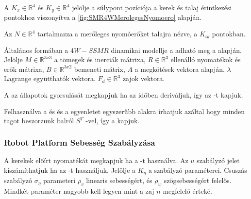 A $K_x\in \mathbb{R}^4$ és $K_y\in \mathbb{R}^4$ jelölje a súlypont pozíciója a kerek és talaj érintkezési pontokhoz viszonyítva a \ref{fig:SMR4WMerolegesNyomoero} alapján.

Az $N \in \mathbb{R}^4$ tartalmazza a merőleges nyomóerőket talajra nézve, a $K_{ik}$ pontokban. 



Általános formában a $4W-SSMR$ dinamikai modellje a  adható meg a \cite{RobustMotionControl} alapján. Jelölje $M \in \mathbb{R}^{3x3}$ a tömegek és inerciák mátrixa, $R \in \mathbb{R}^{3}$ ellenálló nyomatékok és erők mátrixa,  $B \in \mathbb{R}^{3x2}$ bemeneti mátrix, $A$ a megkötések vektora  alapján, $\lambda$ Lagrange együtthatók vektora. $F_d \in \mathbb{R}^{3}$ zajok vektora.

A   az állapotok gyorsulását megkapjuk ha az  időben deriváljuk, így az -t kapjuk.

Felhasználva a   és  és  a  egyenletet egyszerűbb alakra írhatjuk azáltal hogy minden tagot beszorzunk balról $S^T$ -vel, így a  kapjuk.





\subsubsection{Robot Platform Sebesség Szabályzása}

A kerekek előírt nyomatékát megkapjuk ha a   -t használva. Az $u$ szabályzó jelet kiszámíthatjuk ha az -t használjuk. Jelölje a $K_\eta$ a szabályzó paraméterei. Csuszás szabályzó  $\sigma_\eta$ parameteri $\rho_v$ linearis sebességért, és $\rho_w$ szögsebességért felelős. Mindkét paraméter nagyobb kell legyen mint a zaj $n$ megfelelő érteké.

\renewcommand{\img}{SajatRobot/SzerkAbrak/SebContRefNyom.tex}
\renewcommand{\sources}{*}
\renewcommand{\captionn}{Kinematikai modell az $SSMR$ típusú $MR$ robotnak.}
\renewcommand{\figlabel}{DinamicSpeedController}






